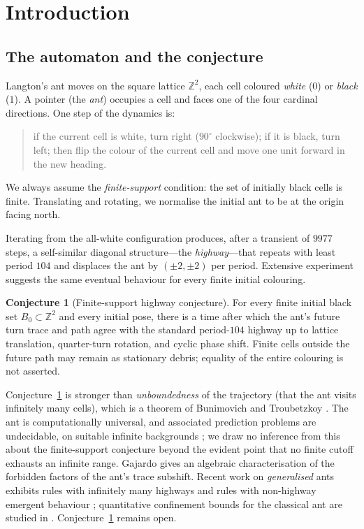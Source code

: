 \documentclass[11pt,reqno]{amsart}
\theoremstyle{plain}
\theoremstyle{definition}
\newtheorem{conjecture}[theorem]{Conjecture}
\newcommand{\Z}{\mathbb{Z}}
\begin{document}
\newpage
\tableofcontents
\newpage

\section{Introduction}

\subsection{The automaton and the conjecture}
Langton's ant moves on the square lattice $\Z^2$, each cell coloured
\emph{white} ($0$) or \emph{black} ($1$). A pointer (the \emph{ant}) occupies a
cell and faces one of the four cardinal directions. One step of the dynamics is:
\begin{quote}
if the current cell is white, turn right ($90^\circ$ clockwise); if it is black,
turn left; then flip the colour of the current cell and move one unit forward in
the new heading.
\end{quote}
We always assume the \emph{finite-support} condition: the set of initially black
cells is finite. Translating and rotating, we normalise the initial ant to be at
the origin facing north.

Iterating from the all-white configuration produces, after a transient of
$9977$ steps, a self-similar diagonal structure---the \emph{highway}---that
repeats with least period $104$ and displaces the ant by $(\pm2,\pm2)$ per
period. Extensive experiment suggests the same eventual behaviour for every
finite initial colouring.

\begin{conjecture}[Finite-support highway conjecture]\label{conj:main}
For every finite initial black set $B_0\subset\Z^2$ and every initial pose, there
is a time after which the ant's future turn trace and path agree with the standard
period-$104$ highway up to lattice translation, quarter-turn rotation, and cyclic
phase shift. Finite cells outside the future path may remain as stationary debris;
equality of the entire colouring is not asserted.
\end{conjecture}

Conjecture~\ref{conj:main} is stronger than \emph{unboundedness} of the
trajectory (that the ant visits infinitely many cells), which is a theorem of
Bunimovich and Troubetzkoy \cite{BunimovichTroubetzkoy1992}. The ant is
computationally universal, and associated prediction problems are undecidable, on
suitable infinite backgrounds \cite{GajardoMoreiraGoles2002}; we draw no inference
from this about the finite-support conjecture beyond the evident point that no
finite cutoff exhausts an infinite range. Gajardo \cite{Gajardo2014symbolic} gives
an algebraic characterisation of the forbidden factors of the ant's trace subshift.
Recent work on \emph{generalised} ants exhibits rules with infinitely many highways
\cite{GajardoLutfallaRao2024} and rules with non-highway emergent behaviour
\cite{Lutfalla2025sideways}; quantitative confinement bounds for the classical ant
are studied in \cite{Etse2026confined}. Conjecture~\ref{conj:main} remains open.
\end{document}
